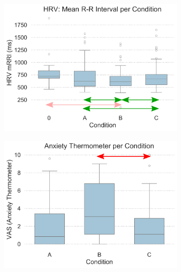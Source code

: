 \begin{figure}[htb]
	\centering
	\begin{subfigure}[t]{0.49\columnwidth}
		\centering
		\includegraphics[width=\textwidth]{include/images/hrv_per_condition.pdf}
		\label{fig:stress-hrv}
	\end{subfigure}
	\hspace*{\fill}
	\begin{subfigure}[t]{0.49\columnwidth}
		\centering
		\includegraphics[width=\textwidth]{include/images/at_per_condition.pdf}
		\label{fig:anxiety-at}
	\end{subfigure}
	\label{fig:stress-anxiety}
\end{figure}